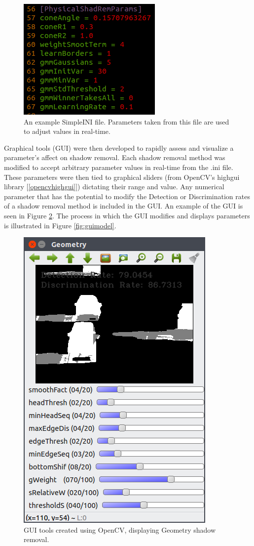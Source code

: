 \begin{figure}
  \centering
  \includegraphics[width=.5\linewidth]{figures/simpleini.png}
  \caption{An example SimpleINI file. Parameters taken from this file are used to adjust values in real-time.}
  \label{fig:simpleini}
\end{figure}

Graphical tools (GUI) were then developed to rapidly assess and visualize a parameter's affect on shadow removal. Each shadow removal method was modified to accept arbitrary parameter values in real-time from the .ini file. These parameters were then tied to graphical sliders (from OpenCV's highgui library [\ref{opencvhighgui}]) dictating their range and value. Any numerical parameter that has the potential to modify the Detection or Discrimination rates of a shadow removal method is included in the GUI. An example of the GUI is seen in Figure \ref{fig:guitools}. The process in which the GUI modifies and displays parameters is illustrated in Figure \ref{fig:guimodel}.

\begin{figure}
  \centering
  \includegraphics[width=.45\linewidth]{figures/geo_highway1_default.png}

\caption{GUI tools created using OpenCV, displaying Geometry shadow removal.}
\label{fig:guitools}
\end{figure}

